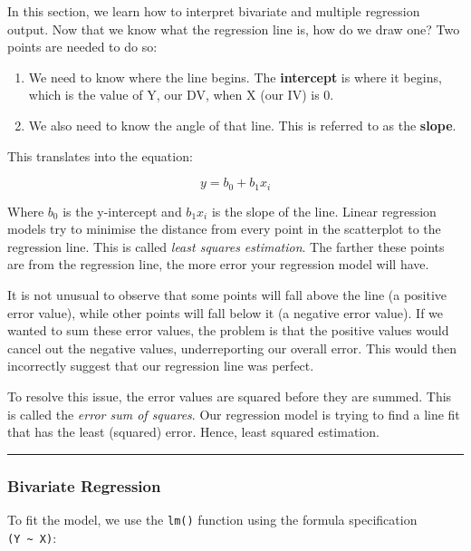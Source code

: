 \documentclass[
]{book}
\begin{document}
In this section, we learn how to interpret bivariate and multiple regression output. Now that we know what the regression line is, how do we draw one? Two points are needed to do so:

\begin{enumerate}
\def\labelenumi{\arabic{enumi}.}
\item
  We need to know where the line begins. The \textbf{intercept} is where it begins, which is the value of Y, our DV, when X (our IV) is 0.
\item
  We also need to know the angle of that line. This is referred to as the \textbf{slope}.
\end{enumerate}

This translates into the equation:

\[y = b_0 + b_1x_i\]

Where \(b_0\) is the y-intercept and \(b_1x_i\) is the slope of the line. Linear regression models try to minimise the distance from every point in the scatterplot to the regression line. This is called \emph{least squares estimation}. The farther these points are from the regression line, the more error your regression model will have.

It is not unusual to observe that some points will fall above the line (a positive error value), while other points will fall below it (a negative error value). If we wanted to sum these error values, the problem is that the positive values would cancel out the negative values, underreporting our overall error. This would then incorrectly suggest that our regression line was perfect.

To resolve this issue, the error values are squared before they are summed. This is called the \emph{error sum of squares}. Our regression model is trying to find a line fit that has the least (squared) error. Hence, least squared estimation.

\begin{center}\rule{0.5\linewidth}{0.5pt}\end{center}

\hypertarget{bivariate-regression}{%
\subsubsection{Bivariate Regression}\label{bivariate-regression}}

To fit the model, we use the \texttt{lm()} function using the formula specification \texttt{(Y\ \textasciitilde{}\ X)}:
\end{document}
